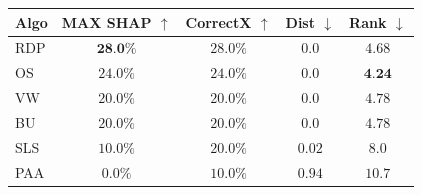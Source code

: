 \begin{tabular}{|l|c|c|c|c|}
\hline
Algo & MAX SHAP $\uparrow$ & CorrectX $\uparrow$ & Dist $\downarrow$ & Rank $\downarrow$ \\
\hline
RDP & $\textbf{28.0}\%$ & $28.0\%$  & $0.0$  & $4.68$ \\
OS & $24.0\%$ & $24.0\%$  & $0.0$  & $\textbf{4.24}$ \\
VW & $20.0\%$ & $20.0\%$  & $0.0$  & $4.78$ \\
BU & $20.0\%$ & $20.0\%$  & $0.0$  & $4.78$ \\
\hline
SLS & $10.0\%$ & $20.0\%$  & $0.02$  & $8.0$ \\
PAA & $0.0\%$ & $10.0\%$  & $0.94$  & $10.7$ \\
\hline
\end{tabular}